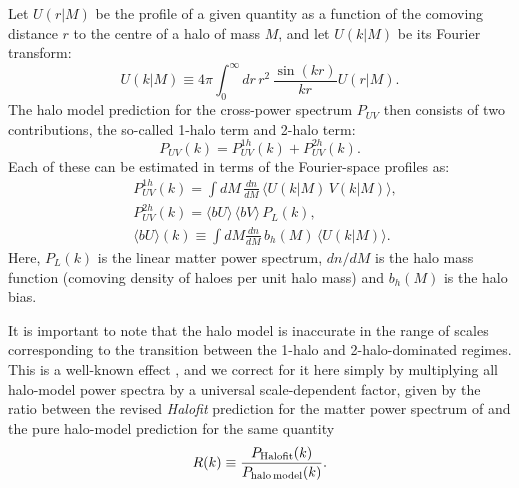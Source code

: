 \documentclass[useAMS,usenatbib]{mn2e}
\begin{document}
    Let $U(r|M)$ be the profile of a given quantity as a function of the comoving distance $r$ to the centre of a halo of mass $M$, and let $U(k|M)$ be its Fourier transform:
    \begin{equation}
      U(k|M)\equiv4\pi \int_0^\infty dr\,r^2\,\frac{\sin(kr)}{kr}U(r|M).
    \end{equation}
    The halo model prediction for the cross-power spectrum $P_{UV}$ then consists of two contributions, the so-called 1-halo term and 2-halo term:
    \begin{equation}
      P_{UV}(k)=P^{1h}_{UV}(k)+P^{2h}_{UV}(k).
    \end{equation}
    Each of these can be estimated in terms of the Fourier-space profiles as:
    \begin{align}
      &P^{1h}_{UV}(k)=\int dM\,\frac{dn}{dM}\,\langle U(k|M)\,V(k|M)\rangle,\\
      &P^{2h}_{UV}(k)=\langle bU\rangle\,\langle bV\rangle\,P_L(k),\\
      &\langle bU\rangle(k)\equiv\int dM\frac{dn}{dM}\,b_h(M)\,\langle U(k|M)\rangle. \label{eq:hm_bias}
    \end{align}
    Here, $P_L(k)$ is the linear matter power spectrum, $dn/dM$ is the halo mass function (comoving density of haloes per unit halo mass) and $b_h(M)$ is the halo bias.

    It is important to note that the halo model is inaccurate in the range of scales corresponding to the transition between the 1-halo and 2-halo-dominated regimes. This is a well-known effect \citep{2015MNRAS.454.1958M}, and we correct for it here simply by multiplying all halo-model power spectra by a universal scale-dependent factor, given by the ratio between the revised {\sl Halofit} prediction for the matter power spectrum of \cite{2012ApJ...761..152T} and the pure halo-model prediction for the same quantity
    \begin{equation}
      R(k)\equiv\frac{P_{\rm Halofit}(k)}{P_{\rm halo\,model}(k)}.
    \end{equation}
    
\end{document}
